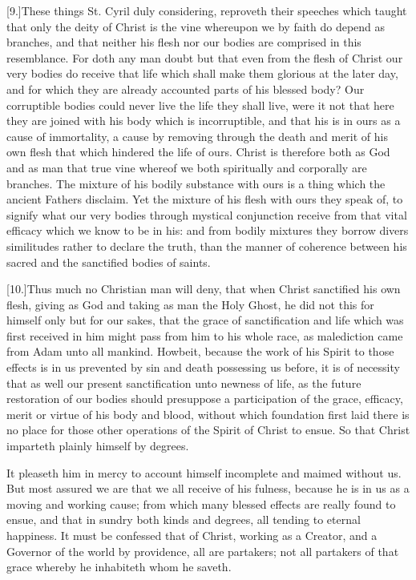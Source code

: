[9.]These things St. Cyril duly considering, reproveth their speeches which taught that only the deity of Christ is the vine whereupon we by faith do depend as branches, and that neither his flesh nor our bodies are comprised in this resemblance. For doth any man doubt but that even from the flesh of Christ our very bodies do receive that life which shall make them glorious at the later day, and  for which they are already accounted parts of his blessed body?
 Our corruptible bodies could never live the life they shall live, were it not that here they are joined with his body which is incorruptible, and that his is in ours as a cause of immortality, a cause by removing through the death and merit of his own flesh that which hindered the life of ours. Christ is therefore both as God and as man that true vine whereof we both spiritually and corporally are branches. The mixture of his bodily substance with ours is a thing which the ancient Fathers disclaim. Yet the mixture of his flesh with ours they speak of, to signify what our very bodies through mystical conjunction receive from that vital efficacy which we know to be in his: and from bodily mixtures they borrow divers similitudes rather to declare the truth, than the manner of coherence between his sacred and the sanctified bodies of saints.

[10.]Thus much no Christian man will deny, that when Christ sanctified his own flesh, giving as God and taking as man the Holy Ghost, he did not this for himself only but for our sakes, that the grace of sanctification and life which was first received in him might pass from him to his whole race, as malediction came from Adam unto all mankind. Howbeit, because the work of his Spirit to those effects is in us prevented by sin and death possessing us before, it is of necessity that as well our present sanctification unto newness of life, as the future restoration of our bodies should presuppose a participation of the grace, efficacy, merit or virtue of  his body and blood, without which foundation first laid there is no place for those other operations of the Spirit of Christ to ensue. So that Christ imparteth plainly himself by degrees.

It pleaseth him in mercy to account himself incomplete and maimed without us. But most assured we are that we all receive of his fulness, because he is in us as a moving and working cause; from which many blessed effects are really found to ensue, and that in sundry both kinds and degrees, all tending to eternal happiness. It must be confessed that of Christ, working as a Creator, and a Governor of the world by providence, all are partakers; not all partakers of that grace whereby he inhabiteth whom he saveth.

